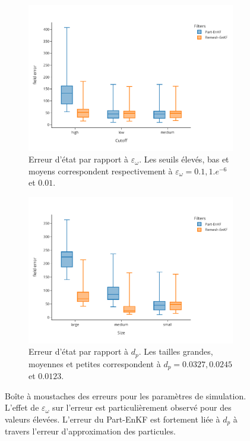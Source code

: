 \begin{figure}[h!]
    \centering

    \begin{subfigure}{0.48\textwidth}
        \centering
        \includegraphics[width=\linewidth]{./images/app2d/final/MSE_cutoff_box.pdf}
        \caption{Erreur d'état par rapport à $\varepsilon_{\omega}$. Les seuils élevés, bas et moyens correspondent respectivement à $\varepsilon_{\omega} = 0.1, 1.e^{-6}$ et $0.01$.}
        \label{fig:cuttoff}
    \end{subfigure}
    \hfill
    \begin{subfigure}{0.48\textwidth}
        \centering
        \includegraphics[width=\linewidth]{./images/app2d/final/MSE_size_box.pdf}
        \caption{Erreur d'état par rapport à $d_p$. Les tailles grandes, moyennes et petites correspondent à $d_p = 0.0327, 0.0245$ et $0.0123$.}
        \label{fig:np}
    \end{subfigure}

    \caption{Boîte à moustaches des erreurs pour les paramètres de simulation. L'effet de $\varepsilon_{\omega}$ sur l'erreur est particulièrement observé pour des valeurs élevées. L'erreur du Part-EnKF est fortement liée à $d_p$ à travers l'erreur d'approximation des particules.}
    \label{fig:simu_parameters_error}
\end{figure}

